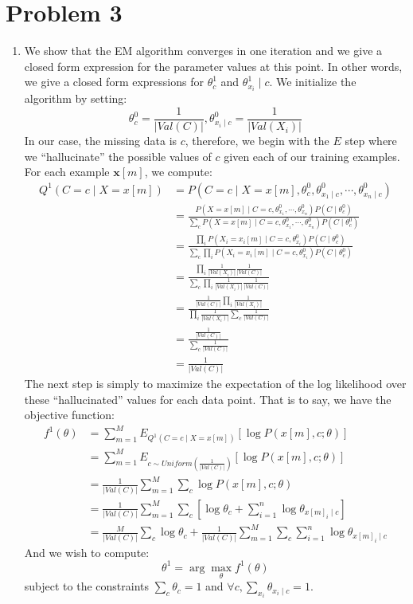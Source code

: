 \documentclass[12pt]{article}
\newcommand{\vect}[1]{\boldsymbol{#1}}
\begin{document}
\pagebreak
\section*{Problem 3}

\begin{enumerate}[label=(\alph*)]
	\item We show that the EM algorithm converges in one iteration and we give a closed form expression for the parameter values at this point. In other words, we give a closed form expressions for $\theta_c^1$ and $\theta^1_{x_i} \mid c$. We initialize the algorithm by setting:
	$$
		\theta_c^0 = \frac{1}{|Val(C)|}, \theta_{x_i \mid c}^0 = \frac{1}{|Val(X_i)|}
	$$
	In our case, the missing data is $c$, therefore, we begin with the $E$ step where we ``hallucinate'' the possible values of $c$ given each of our training examples. For each example $\vect{x}[m]$, we compute:
	\begin{align*}
		Q^1(C = c \mid X = x[m]) &= P(C = c \mid X = x[m], \theta^0_c, \theta^0_{x_1 \mid c}, \cdots, \theta^0_{x_n \mid c}) \\
		&= \frac{P(X = x[m] \mid C = c, \theta^0_{x_1}, \cdots,\theta^0_{x_n})P(C \mid \theta^0_c)}{\sum_{c} P(X = x[m] \mid C = c, \theta^0_{x_1}, \cdots, \theta^0_{x_n})P(C \mid \theta^0_c)} \tag{Bayes Rule and Conditional Independence} \\
		&= \frac{\prod_i P(X_i = x_i[m] \mid C = c, \theta^0_{x_i})P(C \mid \theta_c^0)}{\sum_c \prod_i P(X_i = x_i[m] \mid C = c, \theta^0_{x_i})P(C \mid \theta_c^0)} \\
		&= \frac{\prod_i \frac{1}{|Val(X_i)|} \frac{1}{|Val(C)|}}{\sum_c \prod_i \frac{1}{|Val(X_i)|} \frac{1}{|Val(C)|}} \\
		&= \frac{\frac{1}{|Val(C)|}\prod_i \frac{1}{|Val(X_i)|}}{\prod_i \frac{1}{|Val(X_i)|} \sum_c \frac{1}{|Val(C)|}} \\
		&= \frac{\frac{1}{|Val(C)|}}{\sum_c \frac{1}{|Val(C)|}} \\
		&= \frac{1}{|Val(C)|}
	\end{align*}
	The next step is simply to maximize the expectation of the log likelihood over these ``hallucinated'' values for each data point. That is to say, we have the objective function:
	\begin{align*}
		f^1(\theta) &= \sum_{m=1}^M E_{Q^1(C = c \mid X = x[m])}[\log P(x[m], c; \theta)] \\
		&= \sum_{m=1}^M E_{c \sim Uniform(\frac{1}{|Val(C)|})}[\log P(x[m], c; \theta)] \\
    &= \frac{1}{|Val(C)|}\sum_{m=1}^M\sum_{c} \log P(x[m], c; \theta) \\
    &= \frac{1}{|Val(C)|}\sum_{m=1}^M\sum_{c} [\log \theta_c + \sum_{i=1}^n \log \theta_{x[m]_i \mid c}] \\
    &= \frac{M}{|Val(C)|}\sum_{c} \log \theta_c + \frac{1}{|Val(C)|}\sum_{m=1}^M\sum_c\sum_{i=1}^n \log \theta_{x[m]_i \mid c}
	\end{align*}
	And we wish to compute:
	$$
		\theta^1 = \arg\max_{\theta} f^1(\theta)
	$$
	subject to the constraints $\sum_{c} \theta_c = 1$ and $\forall c, \sum_{x_i} \theta_{x_i \mid c} = 1$.


\end{enumerate}
\end{document}
